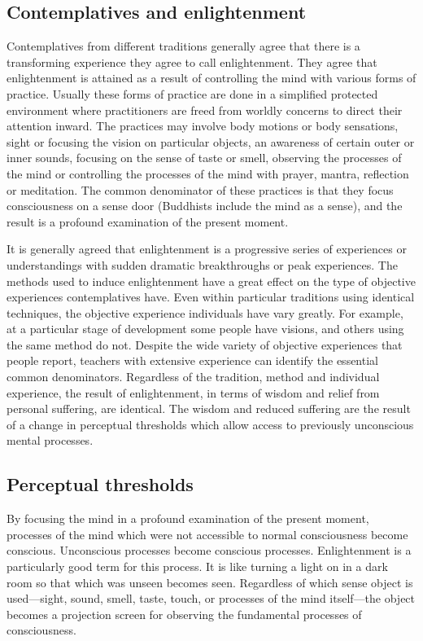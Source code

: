 \documentclass[a5paper,10pt,english]{book}
\begin{document}
\subsection{Contemplatives and enlightenment}
\label{\detokenize{saints:contemplatives-and-enlightenment}}
\sphinxAtStartPar
Contemplatives from different traditions generally agree that there is a
transforming experience they agree to call enlightenment. They agree
that enlightenment is attained as a result of controlling the mind with
various forms of practice. Usually these forms of practice are done in a
simplified protected environment where practitioners are freed from
worldly concerns to direct their attention inward. The practices may
involve body motions or body sensations, sight or focusing the vision on
particular objects, an awareness of certain outer or inner sounds,
focusing on the sense of taste or smell, observing the processes of the
mind or controlling the processes of the mind with prayer, mantra,
reflection or meditation. The common denominator of these practices is
that they focus consciousness on a sense door (Buddhists include the
mind as a sense), and the result is a profound examination of the
present moment.

\sphinxAtStartPar
It is generally agreed that enlightenment is a progressive series of
experiences or understandings with sudden dramatic breakthroughs or peak
experiences. The methods used to induce enlightenment have a great
effect on the type of objective experiences contemplatives have. Even
within particular traditions using identical techniques, the objective
experience individuals have vary greatly. For example, at a particular
stage of development some people have visions, and others using the same
method do not. Despite the wide variety of objective experiences that
people report, teachers with extensive experience can identify the
essential common denominators. Regardless of the tradition, method and
individual experience, the result of enlightenment, in terms of wisdom
and relief from personal suffering, are identical. The wisdom and
reduced suffering are the result of a change in perceptual thresholds
which allow access to previously unconscious mental processes.


\subsection{Perceptual thresholds}
\label{\detokenize{saints:perceptual-thresholds}}
\sphinxAtStartPar
By focusing the mind in a profound examination of the present moment,
processes of the mind which were not accessible to normal consciousness
become conscious. Unconscious processes become conscious processes.
Enlightenment is a particularly good term for this process. It is like
turning a light on in a dark room so that which was unseen becomes seen.
Regardless of which sense object is used—sight, sound, smell, taste,
touch, or processes of the mind itself—the object becomes a projection
screen for observing the fundamental processes of consciousness.
\end{document}
